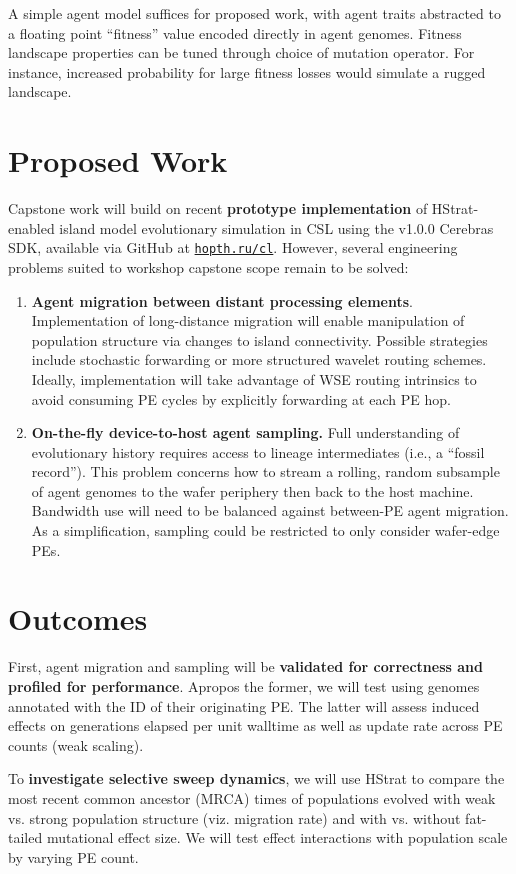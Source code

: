 A simple agent model suffices for proposed work, with agent traits abstracted to a floating point ``fitness'' value encoded directly in agent genomes.
Fitness landscape properties can be tuned through choice of mutation operator.
For instance, increased probability for large fitness losses would simulate a rugged landscape.

\section{Proposed Work}

Capstone work will build on recent \textbf{prototype implementation} of HStrat-enabled island model evolutionary simulation in CSL using the v1.0.0 Cerebras SDK, available via GitHub at \texttt{\href{https://hopth.ru/cl}{hopth.ru/cl}}.
However, several engineering problems suited to workshop capstone scope remain to be solved:
\begin{enumerate}[leftmargin=*]
\item \textbf{Agent migration between distant processing elements}.
Implementation of long-distance migration will enable manipulation of population structure via changes to island connectivity.
Possible strategies include stochastic forwarding or more structured wavelet routing schemes.
Ideally, implementation will take advantage of WSE routing intrinsics to avoid consuming PE cycles by explicitly forwarding at each PE hop.

\item \textbf{On-the-fly device-to-host agent sampling.}
Full understanding of evolutionary history requires access to lineage intermediates (i.e., a ``fossil record'').
This problem concerns how to stream a rolling, random subsample of agent genomes to the wafer periphery then back to the host machine.
Bandwidth use will need to be balanced against between-PE agent migration.
As a simplification, sampling could be restricted to only consider wafer-edge PEs.
\end{enumerate}

\section{Outcomes}

First, agent migration and sampling will be \textbf{validated for correctness and profiled for performance}.
Apropos the former, we will test using genomes annotated with the ID of their originating PE.
The latter will assess induced effects on generations elapsed per unit walltime as well as update rate across PE counts (weak scaling).

To \textbf{investigate selective sweep dynamics}, we will use HStrat to compare the most recent common ancestor (MRCA) times of populations evolved with weak vs. strong population structure (viz. migration rate) and with vs. without fat-tailed mutational effect size.
We will test effect interactions with population scale by varying PE count.
